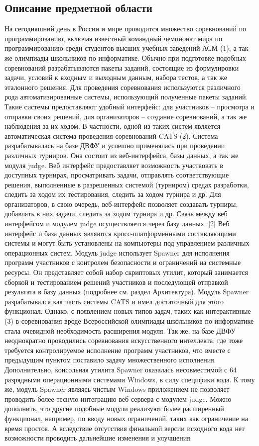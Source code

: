 \documentclass{imcs}
\begin{document}
\subsection{Описание предметной области}

На сегодняшний день в России и мире проводится множество соревнований по программированию, включая известный командный чемпионат мира по программированию среди студентов высших учебных заведений АСМ (1), а так же олимпиады школьников по информатике. Обычно при подготовке подобных соревнований разрабатываются пакеты заданий, состоящие из формулировки задачи, условий к входным и выходным данным,  набора тестов, а так же эталонного решения. Для проведения соревнования используются различного рода автоматизированные системы, использующий полученные пакеты заданий. Такие системы предоставляют удобный интерфейс: для участников – просмотра и отправки своих решений, для организаторов – создание соревнований, а так же наблюдения за их ходом.
В частности, одной из таких систем является автоматическая система проведения соревнований CATS (2). Система разрабатывалась на базе ДВФУ и успешно применялась при проведении различных турниров. Она состоит из веб-интерфейса, базы данных, а так же модуля judge.
Веб интерфейс предоставляет возможность участвовать в доступных турнирах, просматривать задачи, отправлять соответствующие решения, выполненные в разрешенных системой (турниром) средах разработки, следить за ходом их тестирования, следить за ходом турнира и др. Для организаторов, в свою очередь, веб-интерфейс позволяет создавать турниры, добавлять в них задачи, следить за ходом турнира и др.
Связь между веб интерфейсом и модулем judge осуществляется через базу данных. [2] Веб интерфейс и база данных являются кросс-платформенными составляющими системы и могут быть установлены на компьютеры под управлением различных операционных систем.
Модуль judge использует Spawner для исполнения программ участников с контролем безопасности и ограничений на системные ресурсы. Он представляет собой набор скриптовых утилит, который занимается сборкой и тестированием решений участников и последующей отправкой результата в базу данных (подробнее см. раздел Архитектура).
Модуль Spawner разрабатывался как часть системы CATS и имел достаточный для этого функционал. Однако, с появлением новых типов задач, таких как интерактивные (3) в соревнования вроде Всероссийской олимпиады школьников по информатике стала очевидной необходимость расширения модуля. Так же, на базе ДВФУ неоднократно проводились соревнования искусственного интеллекта, где тоже требуется контролируемое исполнение программ участников, что вместе с предыдущим пунктом поставило задачу множественного исполнения. Дополнительно, консольная утилита Spawner оказалась несовместимой с 64 разрядными операционными системами Windows, в силу специфики кода. К тому же, модуль Spawner являясь чистым Windows приложением не позволяет проводить более тесную интеграцию веб-сервера с модулем judge. Можно дополнить, что другие подобные модули реализуют более расширенный функционал, например, по вводу новых ограничений, таких как ограничение на время простоя. А вследствие отсутствия финальной версии исходного кода нет возможности проводить дальнейшие изменения и улучшения.
\end{document}
